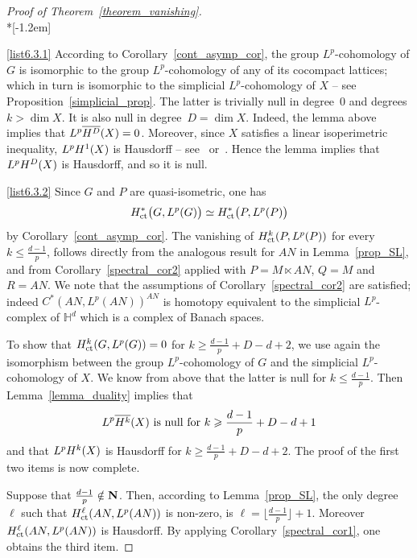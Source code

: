 \documentclass[11pt]{article}
\theoremstyle{definition}
\numberwithin{equation}{section}
\numberwithin{figure}{section}
\numberwithin{table}{section}
\DeclareMathOperator{\ct}{ct}
\begin{document}
\begin{proof}[Proof of Theorem~\ref{theorem_vanishing}]\ \\*[-1.2em]

\eqref{list6.3.1} According to Corollary~\ref{cont_asymp_cor}, the group $L^p$-cohomology of $G$ is isomorphic to the group $L^p$-cohomology of any of its cocompact lattices; which in turn is isomorphic to the simplicial $L^p$-cohomology of $X$ -- see Proposition~\ref{simplicial_prop}. The latter is trivially null in degree~$0$ and degrees $k > \dim X$. It is also null in degree~$D = \dim X$. Indeed, the lemma above implies that $L^p \overline{{\rm H}^D} (X) = 0$. Moreover, since $X$ satisfies a linear isoperimetric inequality, $L^p {\rm H}^1 (X)$ is Hausdorff -- see~\cite{P2} or~\cite{G}. Hence the lemma implies that $L^p {\rm H}^D (X)$ is Hausdorff, and so it is null.

\eqref{list6.3.2} Since $G$ and $P$ are quasi-isometric, one has
\[{\rm H}^* _{\ct}\bigl(G, L^p(G) \bigr) \simeq {\rm H}^* _{\ct}\bigl(P, L^p(P)\bigr)
\]
by Corollary~\ref{cont_asymp_cor}. The vanishing of ${\rm H}^k _{\ct}(P, L^p(P))$ for every $k \leqslant \frac{d-1}{p}$, follows directly from the analogous result for $AN$ in Lemma~\ref{prop_SL}, and from Corollary~\ref{spectral_cor2} applied with $P = M \ltimes AN$, $Q = M$ and $R=AN$. We note that the assumptions of Corollary~\ref{spectral_cor2} are satisfied; indeed $C^*(AN, L^p(AN))^{AN}$ is homotopy equivalent to the simplicial $L^p$-complex of $\mathbb H ^d$ which is a complex of Banach spaces.

To show that ${\rm H}^k _{\ct} (G, L^p(G)) = 0$ for $k \geqslant \frac{d-1}{p} +D -d +2$, we use again the isomorphism between the group $L^p$-cohomology of $G$ and the simplicial $L^p$-cohomology of $X$. We know from above that the latter is null for $k \leqslant \frac{d-1}{p}$. Then Lemma~\ref{lemma_duality} implies that
\[
L^p \overline{{\rm H}^k} (X)\text{ is null for }k \geqslant \frac{d-1}{p} +D -d +1
\]
and that $L^p {\rm H}^k (X)$ is Hausdorff for $k \geqslant \frac{d-1}{p} +D -d +2$. The proof of the first two items is now complete.

Suppose that $\frac{d-1}{p} \notin {\bf N}$. Then, according to Lemma~\ref{prop_SL}, the only degree $\ell$ such that ${\rm H}^\ell _{\ct} (AN, L^p(AN))$ is non-zero, is $\ell = \lfloor \frac{d-1}{p} \rfloor +1$. Moreover ${\rm H}^\ell _{\ct} (AN, L^p(AN))$ is Hausdorff. By applying Corollary~\ref{spectral_cor1}, one obtains the third item.
\end{proof}
\end{document}
